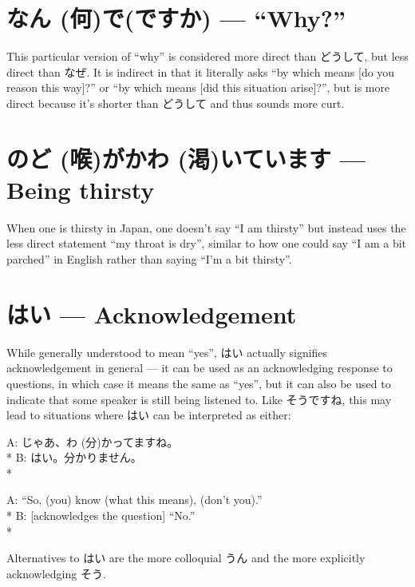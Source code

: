 \documentclass[11pt, b5paper, twoside, openright, onecolumn]{book}
\makeatletter
\newcommand*{\rubystack}[2]{{\relscale{0.5}%
  \begin{tabular}[b]{@{}c@{}}%
    {#1}\\%
   {\textscale{2}{#2}}%
  \end{tabular}}%
}
\DeclareRobustCommand*{\ruby}[2]{%
  \mbox{%
    \setlength{\parskip}{0ex}%
    \BeginAccSupp{method=pdfstringdef,ActualText={#1}}%
      \rubystack{\phantom{#2}}{#1}%
      \llap{%
        \rubystack{#2}{\phantom{#1}}%
      }%
    \EndAccSupp{}%
  }%
}
\renewcommand*{\ruby}[2]{#2 (#1)}%
\newenvironment{exampleblock}{
\setlength{\parindent}{0.6in}
\begin{minipage}[t]{\dimexpr\textwidth-\parindent}}
{\end{minipage}}
\makeatother
\begin{document}
\section*{\ruby{何}{なん}で(ですか) — “Why?”}

This particular version of “why” is considered more direct than どうして‚ but less direct than なぜ. It is indirect in that it literally asks “by which means [do you reason this way]?” or “by which means [did this situation arise]?”‚ but is more direct because it’s shorter than どうして and thus sounds more curt.


\section*{\ruby{喉}{のど}が\ruby{渇}{かわ}いています — Being thirsty}

When one is thirsty in Japan‚ one doesn’t say “I am thirsty” but instead uses the less direct statement “my throat is dry”‚ similar to how one could say “I am a bit parched” in English rather than saying “I’m a bit thirsty”.

\section*{はい — Acknowledgement}

While generally understood to mean “yes”‚ はい actually signifies acknowledgement in general — it can be used as an acknowledging response to questions‚ in which case it means the same as “yes”‚ but it can also be used to indicate that some speaker is still being listened to. Like そうですね‚ this may lead to situations where はい can be interpreted as either:

\vspace{0.4cm}
\begin{exampleblock}
A: じゃあ、\ruby{分}{わ}かってますね。 \\* 
B: はい。分かりません。 \\* 
\end{exampleblock}
\vspace{0.2cm}

\begin{exampleblock}
A: “So‚ (you) know (what this means)‚ (don’t you).” \\* 
B: [acknowledges the question] “No.” \\* 
\end{exampleblock}
\vspace{0.2cm}

Alternatives to はい are the more colloquial うん and the more explicitly acknowledging そう.
\end{document}
